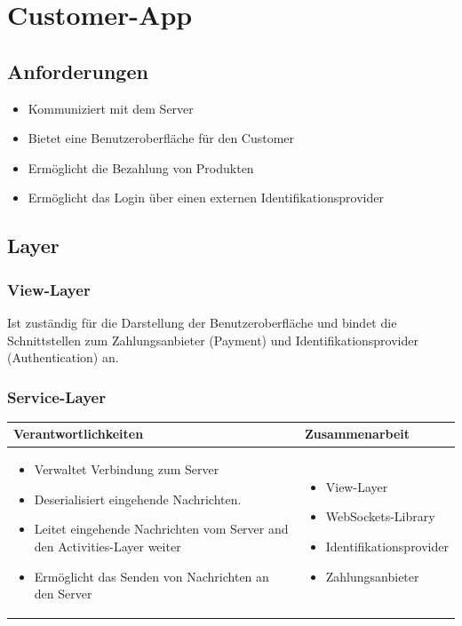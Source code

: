 {\section{Customer-App}

\subsection{Anforderungen}

\begin{itemize}
	\item Kommuniziert mit dem Server
	\item Bietet eine Benutzeroberfläche für den Customer
	\item Ermöglicht die Bezahlung von Produkten
	\item Ermöglicht das Login über einen externen Identifikationsprovider
\end{itemize}

\subsection{Layer}

\subsubsection{View-Layer}
Ist zuständig für die Darstellung der Benutzeroberfläche und bindet die Schnittstellen zum Zahlungsanbieter (Payment) und Identifikationsprovider (Authentication) an.

\subsubsection{Service-Layer}
\begin{tabular}{|p{}|p{}|} \hline
	\textbf{Verantwortlichkeiten} & \textbf{Zusammenarbeit} \\ \hline \hline
	
	\begin{itemize}
		\item Verwaltet Verbindung zum Server
		\item Deserialisiert eingehende Nachrichten.
		\item Leitet eingehende Nachrichten vom Server and den Activities-Layer weiter
		\item Ermöglicht das Senden von Nachrichten an den Server
	\end{itemize}&
	\begin{itemize}
		\item View-Layer
		\item WebSockets-Library
		\item Identifikationsprovider
		\item Zahlungsanbieter
	\end{itemize}
	\\ \hline
\end{tabular}



}
